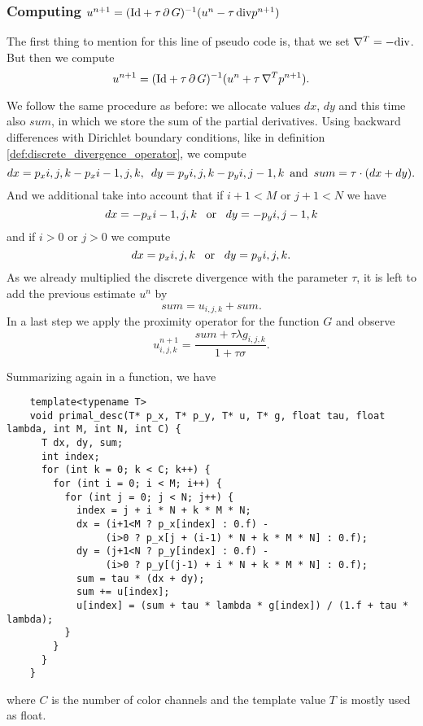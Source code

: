         \subsubsection{Computing $u^{n+1} = (\textnormal{Id} + \tau\,\partial\,G)^{-1}(u^{n} - \tau\,\textnormal{div}p^{n+1})$}
        \label{sub:computing_u}

            The first thing to mention for this line of pseudo code is, that we set $\nabla^{T} = -\textnormal{div}$. But then we compute
                $$
                    u^{n+1} = (\textnormal{Id} + \tau\,\partial\,G)^{-1}(u^{n} + \tau\,\nabla^{T}p^{n+1}).
                $$

            We follow the same procedure as before: we allocate values $dx$, $dy$ and this time also $sum$, in which we store the sum of the partial derivatives. Using backward differences with Dirichlet boundary conditions, like in definition \ref{def:discrete_divergence_operator}, we compute
                $$
                    dx = p_x{i,j,k} - p_x{i-1,j,k}, \,\,\, dy = p_y{i,j,k} - p_y{i,j-1,k} \,\,\, \textnormal{and} \,\,\, sum = \tau \cdot (dx + dy).
                $$
            And we additional take into account that if $i + 1 < M$ or $j + 1 < N$ we have
                $$
                    dx = -p_x{i-1,j,k} \,\,\,\,\, \textnormal{or} \,\,\,\,\, dy = -p_y{i,j-1,k}
                $$
            and if $i > 0$ or $j > 0$ we compute
                $$
                    dx = p_x{i,j,k} \,\,\,\,\, \textnormal{or} \,\,\,\,\, dy = p_y{i,j,k}.
                $$
            As we already multiplied the discrete divergence with the parameter $\tau$, it is left to add the previous estimate $u^{n}$ by
                $$
                    sum = u_{i,j,k} + sum.
                $$
            In a last step we apply the proximity operator for the function $G$ and observe
                $$
                    u_{i,j,k}^{n+1} = \frac{sum + \tau\lambda g_{i,j,k}}{1 + \tau\sigma}.
                $$
                \begin{algorithm}
                \label{alg:primal_descent}
                    Summarizing again in a function, we have
                    \begin{lstlisting}
    template<typename T>
    void primal_desc(T* p_x, T* p_y, T* u, T* g, float tau, float lambda, int M, int N, int C) {
      T dx, dy, sum;
      int index;
      for (int k = 0; k < C; k++) {
        for (int i = 0; i < M; i++) {
          for (int j = 0; j < N; j++) {
            index = j + i * N + k * M * N;
            dx = (i+1<M ? p_x[index] : 0.f) -
                 (i>0 ? p_x[j + (i-1) * N + k * M * N] : 0.f);
            dy = (j+1<N ? p_y[index] : 0.f) -
                 (i>0 ? p_y[(j-1) + i * N + k * M * N] : 0.f);
            sum = tau * (dx + dy);
            sum += u[index];
            u[index] = (sum + tau * lambda * g[index]) / (1.f + tau * lambda);
          }
        }
      }
    }
                    \end{lstlisting}
                    where $C$ is the number of color channels and the template value $T$ is mostly used as float.
                \end{algorithm}

